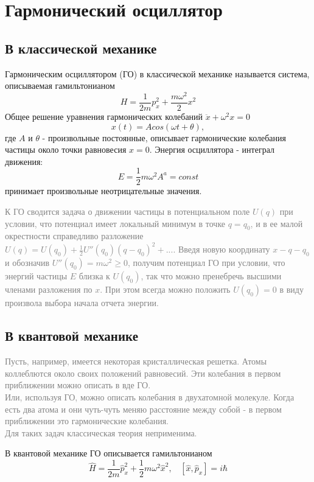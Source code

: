 \section{Гармонический осциллятор}
	\subsection{В классической механике}
		Гармоническим осциллятором (ГО) в классической механике называется система, описываемая гамильтонианом
		$$
			H = \frac{1}{2m}p_x^2+\frac{m\omega^2}{2}x^2
		$$
		Общее решение уравнения гармонических колебаний $\ddot x +\omega^2x = 0$ 
		$$
			x(t) = Acos(\omega t + \theta),
		$$
		где $A$ и $\theta$ - произвольные постоянные, описывает гармонические колебания частицы около точки равновесия $x=0$. Энергия осциллятора - интеграл движения:
		$$
			E = \frac{1}{2}m\omega^2 A^a = const
		$$
		принимает произвольные неотрицательные значения.
		
		\begin{scriptsize}
		\begin{spacing}{0.3}
		\textcolor{gray}{
			К ГО сводится задача о движении частицы в потенциальном поле $U(q)$ при условии, что потенциал имеет локальный минимум в точке $q = q_0$, и в ее малой окрестности справедливо разложение $U(q) = U(q_0) + \frac{1}{2}U''(q_0)(q-q_0)^2 + ...$. Введя новую координату $x-q-q_0$ и обозначив $U''(q_0) = m\omega^2 \ge 0$, получим потенциал ГО при условии, что энергий  частицы $E$ близка к $U(q_0)$, так что можно пренебречь высшими членами разложения по $x$. При этом всегда можно положить $U(q_0) = 0$ в виду произвола выбора начала отчета энергии.
		}	
		\end{spacing}
		\end{scriptsize}
	
	\subsection{В квантовой механике}
		\begin{scriptsize}
		\begin{spacing}{0.3}
		\textcolor{gray}{
			Пусть, например, имеется некоторая кристаллическая решетка. Атомы коллеблются около своих положений равновесий. Эти колебания в первом приближении можно описать в вде ГО.\\
			Или, используя ГО, можно описать колебания в двухатомной молекуле. Когда есть два атома и они чуть-чуть меняю расстояние между собой - в первом приближении это гармонические колебания.\\
			Для таких задач классическая теория неприменима.
		}	
		\end{spacing}
		\end{scriptsize}	
		\bigskip
		В квантовой механике ГО описывается гамильтонианом
		$$
			\hat{H} = \frac{1}{2m}\hat{p}^2_x+\frac{1}{2}m\omega^2\hat{x}^2, \ \ \ \ [\hat{x},\hat{p}_x]=i\hbar
		$$
